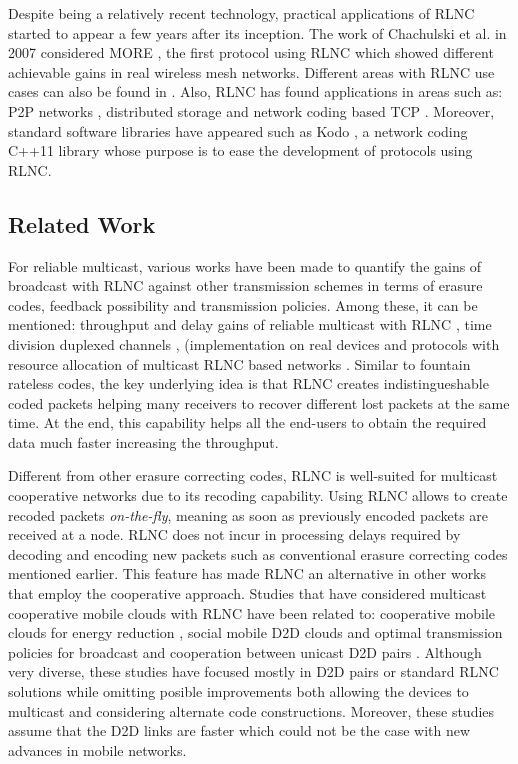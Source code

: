 Despite being a relatively recent technology, practical applications of \ac{RLNC} started to appear a few years after its inception. The work of Chachulski et al. in 2007 considered \ac{MORE} \cite{chachulski2007more}, the first protocol using \ac{RLNC} which showed different achievable gains in real wireless mesh networks. Different areas with \ac{RLNC} use cases can also be found in \cite{fragouli2006network}. Also, \ac{RLNC} has found applications in areas such as: \ac{P2P} networks \cite{gkantsidis2005network}, distributed storage \cite{dimakis2010network} and network coding based \ac{TCP} \cite{kim2014modeling}. Moreover, standard software libraries have appeared such as Kodo \cite{kodo2011pedersen}, a network coding C++11 library whose purpose is to ease the development of protocols using \ac{RLNC}.

\subsection{Related Work}

For reliable multicast, various works have been made to quantify the gains of broadcast with \ac{RLNC} against other transmission schemes in terms of erasure codes, feedback possibility and transmission policies. Among these, it can be mentioned: throughput and delay gains of reliable multicast with \ac{RLNC} \cite{eryilmaz2008delay}, time division duplexed channels \cite{lucani2009random,lucani2009queue}, (implementation on real devices \cite{heide2009network} and protocols with resource allocation of multicast \ac{RLNC} based networks \cite{vukobratovic2014random,chiti2013optimized,tassi2015resource}. Similar to fountain rateless codes, the key underlying idea is that \ac{RLNC} creates indistingueshable coded packets helping many receivers to recover different lost packets at the same time. At the end, this capability helps all the end-users to obtain the required data much faster increasing the throughput.

Different from other erasure correcting codes, \ac{RLNC} is well-suited for multicast cooperative networks due to its recoding capability. Using \ac{RLNC} allows to create recoded packets \textit{on-the-fly}, meaning as soon as previously encoded packets are received at a node. \ac{RLNC} does not incur in processing delays required by decoding and encoding new packets such as conventional erasure correcting codes mentioned earlier. This feature has made \ac{RLNC} an alternative in other works that employ the cooperative approach. Studies that have considered multicast cooperative mobile clouds with \ac{RLNC} have been related to: cooperative mobile clouds for energy reduction \cite{heide2012green}, social mobile \ac{D2D} clouds \cite{fitzek2013implementation} and optimal transmission policies for broadcast and cooperation between unicast \ac{D2D} pairs \cite{khamfroush2013minimizing,khamfroush2015optimal}. Although very diverse, these studies have focused mostly in \ac{D2D} pairs or standard \ac{RLNC} solutions while omitting posible improvements both allowing the devices to multicast and considering alternate code constructions. Moreover, these studies assume that the \ac{D2D} links are faster which could not be the case with new advances in mobile networks.

\clearpage
